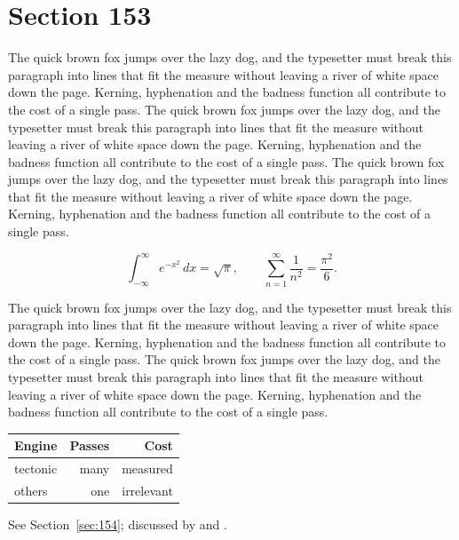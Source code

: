 \documentclass{article}
\begin{document}
\section{Section 153}
\label{sec:153}
The quick brown fox jumps over the lazy dog, and the typesetter must break this paragraph into lines that fit the measure without leaving a river of white space down the page. Kerning, hyphenation and the badness function all contribute to the cost of a single pass. The quick brown fox jumps over the lazy dog, and the typesetter must break this paragraph into lines that fit the measure without leaving a river of white space down the page. Kerning, hyphenation and the badness function all contribute to the cost of a single pass. The quick brown fox jumps over the lazy dog, and the typesetter must break this paragraph into lines that fit the measure without leaving a river of white space down the page. Kerning, hyphenation and the badness function all contribute to the cost of a single pass. 

\begin{equation}\label{eq:153}
\int_{-\infty}^{\infty} e^{-x^{2}}\,dx = \sqrt{\pi}, \qquad
\sum_{n=1}^{\infty} \frac{1}{n^{2}} = \frac{\pi^{2}}{6}.
\end{equation}

The quick brown fox jumps over the lazy dog, and the typesetter must break this paragraph into lines that fit the measure without leaving a river of white space down the page. Kerning, hyphenation and the badness function all contribute to the cost of a single pass. The quick brown fox jumps over the lazy dog, and the typesetter must break this paragraph into lines that fit the measure without leaving a river of white space down the page. Kerning, hyphenation and the badness function all contribute to the cost of a single pass. 

\begin{center}
\begin{tabular}{lrr}
\toprule
Engine & Passes & Cost \\
\midrule
tectonic & many & measured \\
others & one & irrelevant \\
\bottomrule
\end{tabular}
\end{center}

See Section~\ref{sec:154}; discussed by \textcite{k4} and \textcite{l1}.
\end{document}
